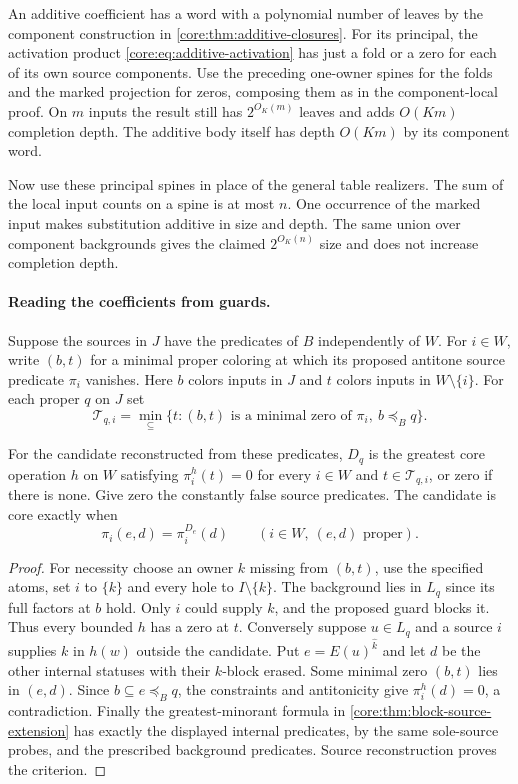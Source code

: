 An additive coefficient has a word with a polynomial
number of leaves by the component construction in
\cref{core:thm:additive-closures}. For its principal,
the activation product \eqref{core:eq:additive-activation}
has just a fold or a zero for each of its own source
components. Use the preceding one-owner spines for
the folds and the marked projection for zeros, composing
them as in the component-local proof. On $m$ inputs
the result still has $2^{O_K(m)}$ leaves and adds
$O(Km)$ completion depth. The additive body itself
has depth $O(Km)$ by its component word.

Now use these principal spines in place of the general
table realizers. The sum of the local input counts on
a spine is at most $n$. One occurrence of the marked
input makes substitution additive in size and depth.
The same union over component backgrounds gives the
claimed $2^{O_K(n)}$ size and does not increase
completion depth.

\paragraph{Reading the coefficients from guards.}
Suppose the sources in $J$ have the predicates of $B$ independently
of $W$. For $i\in W$, write $(b,t)$ for a minimal proper coloring
at which its proposed antitone source predicate $\pi_i$ vanishes.
Here $b$ colors inputs in $J$ and $t$ colors inputs in
$W\setminus\{i\}$. For each proper $q$ on $J$ set
\[
 \mathcal T_{q,i}=\min_{\subseteq}
       \{t:(b,t)\text{ is a minimal zero of }\pi_i,\ b\preceq_B q\}.
\]

\begin{lemma}
\label{core:lem:block-source-patterns}
For the candidate reconstructed from these predicates, $D_q$ is the
greatest core operation $h$ on $W$ satisfying
$\pi_i^h(t)=0$ for every $i\in W$ and $t\in\mathcal T_{q,i}$,
or zero if there is none. Give zero the constantly false source
predicates. The candidate is core exactly when
\[
     \pi_i(e,d)=\pi_i^{D_e}(d)
     \qquad(i\in W,\ (e,d)\text{ proper}).
\]
\end{lemma}
\begin{proof}
For necessity choose an owner $k$ missing from $(b,t)$, use the
specified atoms, set $i$ to $\{k\}$ and every hole to
$I\setminus\{k\}$. The background lies in $L_q$ since its full
factors at $b$ hold. Only $i$ could supply $k$, and the proposed
guard blocks it. Thus every bounded $h$ has a zero at $t$.
Conversely suppose $u\in L_q$ and a source $i$ supplies $k$ in
$h(w)$ outside the candidate. Put $e=E(u)^{\widehat k}$ and let
$d$ be the other internal statuses with their $k$-block erased.
Some minimal zero $(b,t)$ lies in $(e,d)$. Since
$b\subseteq e\preceq_B q$, the constraints and antitonicity give
$\pi_i^h(d)=0$, a contradiction. Finally the greatest-minorant
formula in \cref{core:thm:block-source-extension} has exactly the
displayed internal predicates, by the same sole-source probes, and
the prescribed background predicates. Source reconstruction proves
the criterion.
\end{proof}

